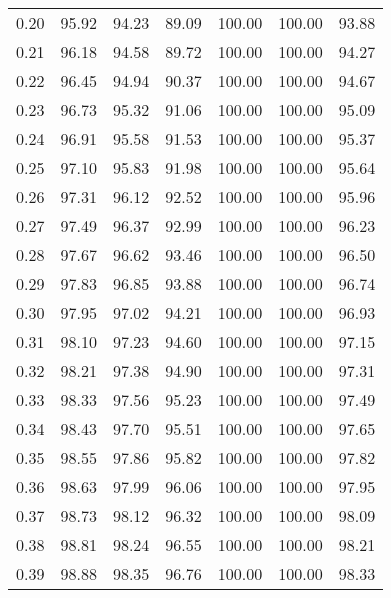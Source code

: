 \begin{tabular}{|c|c|c|c|c|c|c|}
      0.20 &     95.92 &     94.23 &      89.09 &  100.00 &     100.00 &         93.88 \\
      0.21 &     96.18 &     94.58 &      89.72 &  100.00 &     100.00 &         94.27 \\
      0.22 &     96.45 &     94.94 &      90.37 &  100.00 &     100.00 &         94.67 \\
      0.23 &     96.73 &     95.32 &      91.06 &  100.00 &     100.00 &         95.09 \\
      0.24 &     96.91 &     95.58 &      91.53 &  100.00 &     100.00 &         95.37 \\
      0.25 &     97.10 &     95.83 &      91.98 &  100.00 &     100.00 &         95.64 \\
      0.26 &     97.31 &     96.12 &      92.52 &  100.00 &     100.00 &         95.96 \\
      0.27 &     97.49 &     96.37 &      92.99 &  100.00 &     100.00 &         96.23 \\
      0.28 &     97.67 &     96.62 &      93.46 &  100.00 &     100.00 &         96.50 \\
      0.29 &     97.83 &     96.85 &      93.88 &  100.00 &     100.00 &         96.74 \\
      0.30 &     97.95 &     97.02 &      94.21 &  100.00 &     100.00 &         96.93 \\
      0.31 &     98.10 &     97.23 &      94.60 &  100.00 &     100.00 &         97.15 \\
      0.32 &     98.21 &     97.38 &      94.90 &  100.00 &     100.00 &         97.31 \\
      0.33 &     98.33 &     97.56 &      95.23 &  100.00 &     100.00 &         97.49 \\
      0.34 &     98.43 &     97.70 &      95.51 &  100.00 &     100.00 &         97.65 \\
      0.35 &     98.55 &     97.86 &      95.82 &  100.00 &     100.00 &         97.82 \\
      0.36 &     98.63 &     97.99 &      96.06 &  100.00 &     100.00 &         97.95 \\
      0.37 &     98.73 &     98.12 &      96.32 &  100.00 &     100.00 &         98.09 \\
      0.38 &     98.81 &     98.24 &      96.55 &  100.00 &     100.00 &         98.21 \\
      0.39 &     98.88 &     98.35 &      96.76 &  100.00 &     100.00 &         98.33 \\

\end{tabular}
